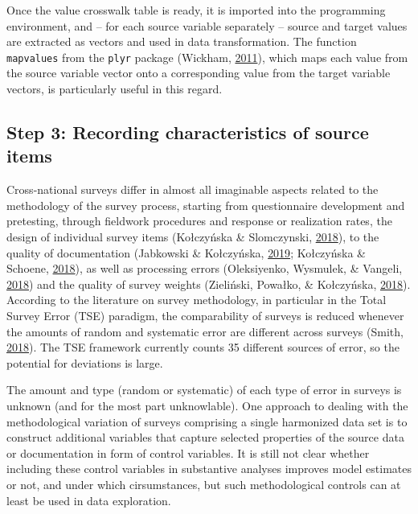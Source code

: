 \documentclass[12pt,]{article}
\begin{document}
Once the value crosswalk table is ready, it is imported into the programming environment, and -- for each source variable separately -- source and target values are extracted as vectors and used in data transformation. The function \texttt{mapvalues} from the \texttt{plyr} package (Wickham, \protect\hyperlink{ref-Wickham2011}{2011}), which maps each value from the source variable vector onto a corresponding value from the target variable vectors, is particularly useful in this regard.

\hypertarget{step-3-recording-characteristics-of-source-items}{%
\subsection{Step 3: Recording characteristics of source items}\label{step-3-recording-characteristics-of-source-items}}

Cross-national surveys differ in almost all imaginable aspects related to the methodology of the survey process, starting from questionnaire development and pretesting, through fieldwork procedures and response or realization rates, the design of individual survey items (Kołczyńska \& Slomczynski, \protect\hyperlink{ref-KolczynskaSlomczynski2018}{2018}), to the quality of documentation (Jabkowski \& Kołczyńska, \protect\hyperlink{ref-Jabkowski2019}{2019}; Kołczyńska \& Schoene, \protect\hyperlink{ref-KolczynskaSchoene2018}{2018}), as well as processing errors (Oleksiyenko, Wysmulek, \& Vangeli, \protect\hyperlink{ref-Oleksiyenko2018}{2018}) and the quality of survey weights (Zieliński, Powałko, \& Kołczyńska, \protect\hyperlink{ref-Zielinski2018}{2018}). According to the literature on survey methodology, in particular in the Total Survey Error (TSE) paradigm, the comparability of surveys is reduced whenever the amounts of random and systematic error are different across surveys (Smith, \protect\hyperlink{ref-Smith2018}{2018}). The TSE framework currently counts 35 different sources of error, so the potential for deviations is large.

The amount and type (random or systematic) of each type of error in surveys is unknown (and for the most part unknowlable). One approach to dealing with the methodological variation of surveys comprising a single harmonized data set is to construct additional variables that capture selected properties of the source data or documentation in form of control variables. It is still not clear whether including these control variables in substantive analyses improves model estimates or not, and under which cirsumstances, but such methodological controls can at least be used in data exploration.
\end{document}
